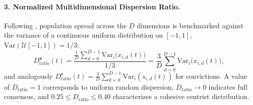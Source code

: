 \paragraph{3. Normalized Multidimensional Dispersion Ratio.}
Following \citet{bramson2016disambiguation}, population spread across the $D$ dimensions is benchmarked against the variance of a continuous uniform distribution on $[-1, 1]$, $\mathrm{Var}(\mathcal{U}[-1, 1]) = 1/3$:
\begin{equation}
    D_{\mathrm{ratio}}^{\mathbf{x}}(t) = \frac{\frac{1}{D}\sum_{d=0}^{D-1} \mathrm{Var}_i\!\big(x_{i,d}(t)\big)}{1/3} = \frac{3}{D}\sum_{d=0}^{D-1} \mathrm{Var}_i\!\big(x_{i,d}(t)\big),
    \label{eq:dispersion_ratio}
\end{equation}
and analogously $D_{\mathrm{ratio}}^{\mathbf{s}}(t) = \frac{3}{D}\sum_{d=0}^{D-1} \mathrm{Var}_i(s_{i,d}(t))$ for convictions. A value of $D_{\mathrm{ratio}} = 1$ corresponds to uniform random dispersion, $D_{\mathrm{ratio}} \to 0$ indicates full consensus, and $0.25 \le D_{\mathrm{ratio}} \le 0.40$ characterizes a cohesive centrist distribution.

